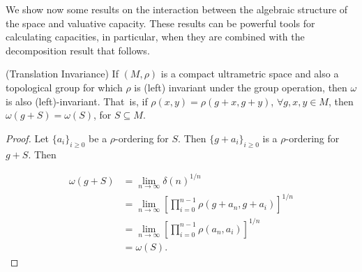 

We show now some results on the interaction between the algebraic structure of the space and valuative capacity. These results can be powerful tools for calculating capacities, in particular, when they are combined with the decomposition result that follows.\\
 
\begin{proposition}
\label{translation invariance}
	(Translation Invariance) If $(M, \rho)$ is a compact ultrametric space and also a topological group for which $\rho$ is (left) invariant under the group operation, then $\omega$ is also (left)-invariant. That\ is, if $\rho(x,y)=\rho(g+x,g+y)$, $ \forall g,x,y \in M$, then $\omega(g+S)=\omega(S)$, for $S \subseteq M$.	
\end{proposition}

\begin{proof}
	Let $\{a_i\}_{i\geq 0}$ be a $\rho$-ordering for $S$. Then $\{g+a_i\}_{i\geq 0}$ is a $\rho$-ordering for $g+S$. Then

	\begin{align*} 
	\omega(g+S) &= \lim_{n\to\infty} \delta(n)^{1/n}   \\
	&= \lim_{n\to\infty} [\prod_{i=0}^{n-1} \rho(g+a_n,g+a_i)]^{1/n}   \\ 
	&=\lim_{n\to\infty} [\prod_{i=0}^{n-1} \rho(a_n,a_i)]^{1/n}	  \\
	&= \omega(S). 
	\end{align*}

\end{proof}	

